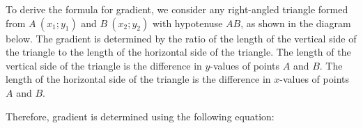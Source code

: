 \setcounter{subfigure}{0}
\begin{figure}[H] %
\begin{center}
\end{center}
\end{figure}        
To derive the formula for gradient, we consider any right-angled triangle formed from $A~(x_1;y_1)$ and $B~(x_2;y_2)$ with hypotenuse $AB$, as shown in the diagram below. The gradient is determined by the ratio of the length of the vertical side of the triangle to the length of the horizontal side of the triangle. The length of the vertical side of the triangle is the difference in $y$-values of points $A$ and $B$. The length of the horizontal side of the triangle is the difference in $x$-values of points $A$ and $B$. 
\setcounter{subfigure}{0}
\begin{figure}[H] %
\begin{center}
\end{center}
\end{figure}  
Therefore, gradient is determined using the following equation:

